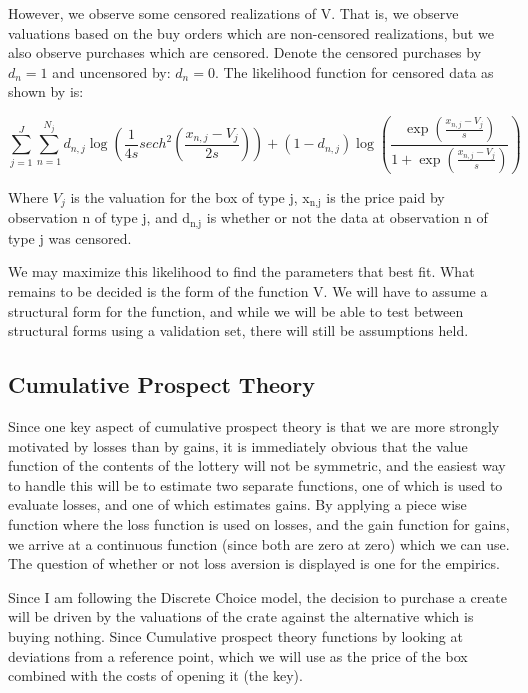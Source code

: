 \documentclass[11pt]{article}
\begin{document}
However, we observe some censored realizations of V. That is, we
observe valuations based on the buy orders which are non-censored
realizations, but we also observe purchases which are censored. Denote
the censored purchases by $d_n = 1$ and uncensored by: $d_n = 0$. The
likelihood function for censored data as shown by \cite{LimeBoy} is:

\begin{equation}
\label{Liklihood}
\sum_{j=1}^J \sum_{n=1}^{N_j} d_{n,j} \log( \frac{1}{4s} sech^2 ( \frac{x_{n,j} - V_j}{2s} ) ) + (1-d_{n,j}) \log ( \frac{\exp(\frac{x_{n,j} - V_j}{s})}{1+\exp(\frac{x_{n,j} - V_j}{s})} )
\end{equation}

Where $V_j$ is the valuation for the box of type j, x$_{\text{n,j}}$ is the price
paid by observation n of type j, and d$_{\text{n,j}}$ is whether or not the data
at observation n of type j was censored.

We may maximize this likelihood to find the parameters that best
fit. What remains to be decided is the form of the function V. We will
have to assume a structural form for the function, and while we will
be able to test between structural forms using a validation set, there
will still be assumptions held.

\subsection{Cumulative Prospect Theory}
\label{sec-2-3}
Since one key aspect of cumulative prospect theory is that we are more
strongly motivated by losses than by gains, it is immediately obvious
that the value function of the contents of the lottery will not be
symmetric, and the easiest way to handle this will be to estimate two
separate functions, one of which is used to evaluate losses, and one
of which estimates gains. By applying a piece wise function where the
loss function is used on losses, and the gain function for gains, we
arrive at a continuous function (since both are zero at zero) which we
can use. The question of whether or not loss aversion is displayed is
one for the empirics.

Since I am following the Discrete Choice model, the decision to
purchase a create will be driven by the valuations of the crate
against the alternative which is buying nothing. Since Cumulative
prospect theory functions by looking at deviations from a reference
point, which we will use as the price of the box combined with the
costs of opening it (the key).
\end{document}
